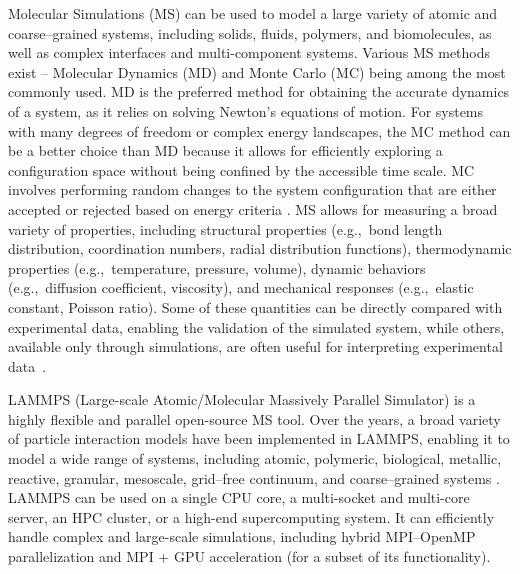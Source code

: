 \documentclass[9pt,tutorial]{livecoms}
\begin{document}
Molecular Simulations (MS) can be used to model a large variety of
atomic and coarse--grained systems, including solids, fluids, polymers, and
biomolecules, as well as complex interfaces and multi-component systems.
Various MS methods exist -- Molecular Dynamics (MD) and Monte Carlo (MC)
being among the most commonly used.  MD is the preferred method for
obtaining the accurate dynamics of a system, as it relies on solving
Newton's equations of motion.  For systems with many degrees of freedom
or complex energy landscapes, the MC method can be a better choice than
MD because it allows for efficiently exploring a configuration space
without being confined by the accessible time scale.  MC involves
performing random changes to the system configuration that are either
accepted or rejected based on energy criteria
\cite{frenkel2023understanding, allen2017computer}.  MS allows for
measuring a broad variety of properties, including structural properties
(e.g.,~bond length distribution, coordination numbers, radial
distribution functions), thermodynamic properties (e.g.,~temperature,
pressure, volume), dynamic behaviors (e.g.,~diffusion coefficient,
viscosity), and mechanical responses (e.g.,~elastic constant, Poisson
ratio).  Some of these quantities can be directly compared with
experimental data, enabling the validation of the simulated system,
while others, available only through simulations, are often useful for
interpreting experimental data~\cite{van2008molecular}.

LAMMPS (Large-scale Atomic/Molecular Massively Parallel Simulator)
\cite{lammps_home} is a highly flexible and parallel open-source MS
tool.  Over the years, a broad variety of particle interaction models
have been implemented in LAMMPS, enabling it to model a wide range of
systems, including atomic, polymeric, biological, metallic, reactive, granular,
mesoscale, grid--free continuum, and coarse--grained systems
\cite{thompson2022lammps}.  LAMMPS can be used on a single CPU core, a
multi-socket and multi-core server, an HPC cluster, or a high-end
supercomputing system.  It can efficiently handle complex and large-scale
simulations, including hybrid MPI--OpenMP parallelization
and MPI + GPU acceleration (for a subset of its functionality).
\end{document}
